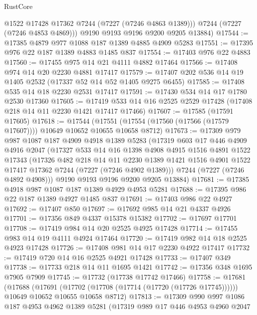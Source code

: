 \begin{lexlean}{RustCore}
\begin{coremodule}
          @1522
          @17428
          @17362
          @7244
          (@7227 (@7246 @4863 @1389)))
        @7244
        (@7227 (@7246 @4853 @4869)))
      @9190
      @9193
      @9196
      @9200
      @9205
      @13884)
@17544 := @17385 @4879 @977 @1088 @187 @1389 @4885 @4909 @5283
@17551 := @17395 @976 @22 @187 @1389 @4883 @1485 @837
@17554 := @17403 @976 @22 @4883
@17560 := @17455 @975 @14 @21 @4111 @4882 @17464
@17566 := @17408 @974 @14 @20 @2230 @4881 @17417
@17579 := @17407 @202 @536 @14 @19 @1405 @2532 (@17337 @52 @14 @52 @1405 @9275 @6455)
@17585 := @17408 @535 @14 @18 @2230 @2531 @17417
@17591 := @17430 @534 @14 @17 @1780 @2530 @17360
@17605 := @17419 @533 @14 @16 @2525 @2529 @17428 (@17408 @218 @14 @11 @2230 @1421 @17417 @17466)
@17607 := @17585 (@17591 @17605)
@17618 := @17544
    (@17551 (@17554 (@17560 (@17566 (@17579 @17607)))) @10649 @10652 @10655 @10658 @8712)
@17673 := @17309
    @979
    @987
    @1087
    @187
    @4909
    @4918
    @1389
    @5283
    (@17319
      @603
      @17
      @446
      @4909
      @4916
      @2047
      (@17327
        @533
        @14
        @16
        @1398
        @4908
        @4915
        @1516
        @4891
        @1522
        @17343
        (@17326
          @482
          @218
          @14
          @11
          @2230
          @1389
          @1421
          @1516
          @4901
          @1522
          @17417
          @17362
          @7244
          (@7227 (@7246 @4902 @1389)))
        @7244
        (@7227 (@7246 @4892 @4908)))
      @9190
      @9193
      @9196
      @9200
      @9205
      @13884)
@17681 := @17385 @4918 @987 @1087 @187 @1389 @4929 @4953 @5281
@17688 := @17395 @986 @22 @187 @1389 @4927 @1485 @837
@17691 := @17403 @986 @22 @4927
@17692 := @17407 @850
@17697 := @17692 @985 @14 @21 @4337 @4926
@17701 := @17356 @849 @4337 @15378 @15382
@17702 := @17697 @17701
@17708 := @17419 @984 @14 @20 @2525 @4925 @17428
@17714 := @17455 @983 @14 @19 @4111 @4924 @17464
@17720 := @17419 @982 @14 @18 @2525 @4923 @17428
@17726 := @17408 @981 @14 @17 @2230 @4922 @17417
@17732 := @17419 @720 @14 @16 @2525 @4921 @17428
@17733 := @17407 @349
@17738 := @17733 @218 @14 @11 @1695 @1421
@17742 := @17356 @348 @1695 @7905 @7909
@17745 := @17732 (@17738 @17742 @17466)
@17758 := @17681
    (@17688
      (@17691 (@17702 (@17708 (@17714 (@17720 (@17726 @17745))))))
      @10649
      @10652
      @10655
      @10658
      @8712)
@17813 := @17309
    @990
    @997
    @1086
    @187
    @4953
    @4962
    @1389
    @5281
    (@17319
      @989
      @17
      @446
      @4953
      @4960
      @2047

\end{coremodule}
\end{lexlean}
